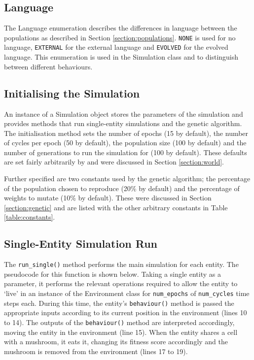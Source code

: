\documentclass[12pt,a4paper,twoside,openright]{report}
\begin{document}
\subsection{Language}

The Language enumeration describes the differences in language between the populations as described in Section \ref{section:populations}. \texttt{NONE} is used for no language, \texttt{EXTERNAL} for the external language and \texttt{EVOLVED} for the evolved language. This enumeration is used in the Simulation class and to distinguish between different behaviours.

\subsection{Initialising the Simulation}\label{section:simulation-initialise}

An instance of a Simulation object stores the parameters of the simulation and provides methods that run single-entity simulations and the genetic algorithm. The initialisation method sets the number of epochs (15 by default), the number of cycles per epoch (50 by default), the population size (100 by default) and the number of generations to run the simulation for (100 by default). These defaults are set fairly arbitrarily by \citet{Cangelosi1998} and were discussed in Section \ref{section:world}.

Further specified are two constants used by the genetic algorithm; the percentage of the population chosen to reproduce (20\% by default) and the percentage of weights to mutate (10\% by default). These were discussed in Section \ref{section:genetic} and are listed with the other arbitrary constants in Table \ref{table:constants}.

\subsection{Single-Entity Simulation Run}\label{section:single-implementation}

The \texttt{run\_single()} method performs the main simulation for each entity. The pseudocode for this function is shown below. Taking a single entity as a parameter, it performs the relevant operations required to allow the entity to `live' in an instance of the Environment class for \texttt{num\_epochs} of \texttt{num\_cycles} time steps each. During this time, the entity's \texttt{behaviour()} method is passed the appropriate inputs according to its current position in the environment (lines 10 to 14). The outputs of the \texttt{behaviour()} method are interpreted accordingly, moving the entity in the environment (line 15). When the entity shares a cell with a mushroom, it eats it, changing its fitness score accordingly and the mushroom is removed from the environment (lines 17 to 19).
\end{document}
